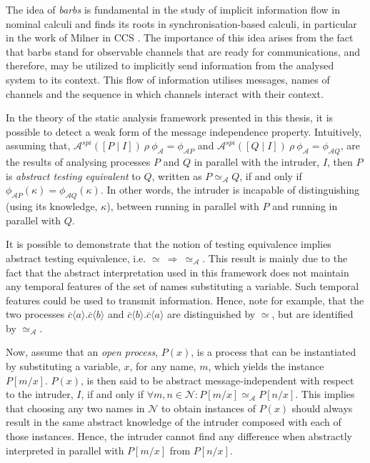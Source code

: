 \documentclass[10pt,a4paper,final,oneside,fleqn]{book}
\begin{document}
The idea of {\itshape barbs\/} is fundamental in the study of implicit information flow in nominal calculi and finds its roots in synchronisation-based calculi, in particular in the work of Milner in CCS \cite{milner5}.  The importance of this idea arises from the fact that barbs stand for observable channels that are ready for communications, and therefore, may be utilized to implicitly send information from the analysed system to its context.  This flow of information utilises messages, names of channels and the sequence in which channels interact with their context.

In the theory of the static analysis framework presented in this thesis, it is possible to detect a weak form of the message independence property.  Intuitively, assuming that, $\mathcal{A}^{spi}(\![P\mid I]\!)~\rho~\phi_\mathcal{A}=\phi_{\mathcal{A}P}$ and $\mathcal{A}^{spi}(\![Q\mid I]\!)~\rho~\phi_\mathcal{A}=\phi_{\mathcal{A}Q}$, are the results of analysing processes $P$ and $Q$ in parallel with the intruder, $I$, then $P$ is {\itshape abstract testing equivalent\/} to $Q$, written as $P\simeq_\mathcal{A} Q$, if and only if $\phi_{\mathcal{A}P}(\kappa)=\phi_{\mathcal{A}Q}(\kappa)$.  In other words, the intruder is incapable of distinguishing (using its knowledge, $\kappa$), between running in parallel with $P$ and running in parallel with $Q$.

It is possible to demonstrate that the notion of testing equivalence \cite{abadi1} implies abstract testing equivalence, i.e. $\simeq~\!\Rightarrow~\!\simeq_\mathcal{A}$.  This result is mainly due to the fact that the abstract interpretation used in this framework does not maintain any temporal features of the set of names substituting a variable.  Such temporal features could be used to transmit information.  Hence, note for example, that the two processes $\overline{c}\langle a\rangle.\overline{c}\langle b\rangle$ and $\overline{c}\langle b\rangle.\overline{c}\langle a\rangle$ are distinguished by $\simeq$, but are identified by $\simeq_\mathcal{A}$.

Now, assume that an {\itshape open process\/}, $P(x)$, is a process that can be instantiated by substituting a variable, $x$, for any name, $m$, which yields the instance $P[m/x]$. $P(x)$, is then said to be abstract message-independent with respect to the intruder, $I$, if and only if $\forall m,n\in\mathcal{N}:P[m/x]\simeq_\mathcal{A}P[n/x]$.  This implies that choosing any two names in $\mathcal{N}$ to obtain instances of $P(x)$ should always result in the same abstract knowledge of the intruder composed with each of those instances.  Hence, the intruder cannot find any difference when abstractly interpreted in parallel with $P[m/x]$ from $P[n/x]$.
\end{document}
